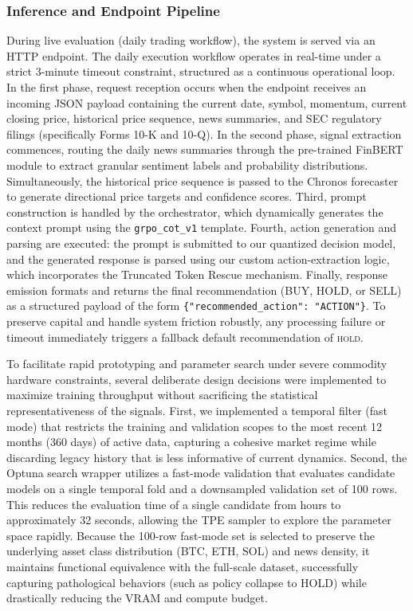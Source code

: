     \subsubsection{Inference and Endpoint Pipeline}
    
    During live evaluation (daily trading workflow), the system is served via an HTTP endpoint. The daily execution workflow operates in real-time under a strict 3-minute timeout constraint, structured as a continuous operational loop. In the first phase, request reception occurs when the endpoint receives an incoming JSON payload containing the current date, symbol, momentum, current closing price, historical price sequence, news summaries, and SEC regulatory filings (specifically Forms 10-K and 10-Q). In the second phase, signal extraction commences, routing the daily news summaries through the pre-trained FinBERT module to extract granular sentiment labels and probability distributions. Simultaneously, the historical price sequence is passed to the Chronos forecaster to generate directional price targets and confidence scores. Third, prompt construction is handled by the orchestrator, which dynamically generates the context prompt using the \texttt{grpo\_cot\_v1} template. Fourth, action generation and parsing are executed: the prompt is submitted to our quantized decision model, and the generated response is parsed using our custom action-extraction logic, which incorporates the Truncated Token Rescue mechanism. Finally, response emission formats and returns the final recommendation (BUY, HOLD, or SELL) as a structured payload of the form \texttt{\{"recommended\_action": "ACTION"\}}. To preserve capital and handle system friction robustly, any processing failure or timeout immediately triggers a fallback default recommendation of \textsc{hold}.
    
    
    
    To facilitate rapid prototyping and parameter search under severe commodity hardware constraints, several deliberate design decisions were implemented to maximize training throughput without sacrificing the statistical representativeness of the signals. First, we implemented a temporal filter (fast mode) that restricts the training and validation scopes to the most recent 12 months (360 days) of active data, capturing a cohesive market regime while discarding legacy history that is less informative of current dynamics. Second, the Optuna search wrapper utilizes a fast-mode validation that evaluates candidate models on a single temporal fold and a downsampled validation set of 100 rows. This reduces the evaluation time of a single candidate from hours to approximately 32 seconds, allowing the TPE sampler to explore the parameter space rapidly. Because the 100-row fast-mode set is selected to preserve the underlying asset class distribution (BTC, ETH, SOL) and news density, it maintains functional equivalence with the full-scale dataset, successfully capturing pathological behaviors (such as policy collapse to HOLD) while drastically reducing the VRAM and compute budget.

